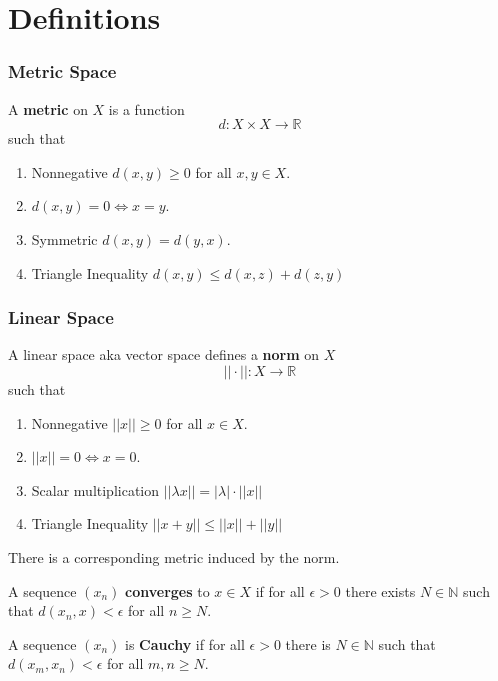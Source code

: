 \documentclass[12pt]{article}
\begin{document}
\section{Definitions}

\subsubsection{Metric Space}
A \textbf{metric} on $X$ is a function
\[
    d: X \times X \rightarrow \mathbb{R}
\]
such that

\begin{enumerate}
    \item Nonnegative $d(x, y) \geq 0$ for all $x, y \in X$.

    \item $d(x, y) = 0 \iff x = y$.

    \item Symmetric $d(x, y) = d(y, x)$.

    \item Triangle Inequality $d(x, y) \leq d(x, z) + d(z, y)$
\end{enumerate}

\subsubsection{Linear Space}
A linear space aka vector space defines a \textbf{norm} on $X$
\[
    || \cdot ||: X \rightarrow \mathbb{R}
\]
such that

\begin{enumerate}
    \item Nonnegative $||x|| \geq 0$ for all $x \in X$.
    \item $||x|| = 0 \iff x = 0$.
    \item Scalar multiplication $|| \lambda x || = |\lambda| \cdot ||x||$
    \item Triangle Inequality $||x + y|| \leq ||x|| + ||y||$

\end{enumerate}

There is a corresponding metric induced by the norm.


A sequence $(x_n)$ \textbf{converges} to $x \in X$ if for all $\epsilon > 0$ there
exists $N \in \mathbb{N}$ such that $d(x_n, x) < \epsilon$ for all $n \geq
N$.

A sequence $(x_n)$ is \textbf{Cauchy} if for all $\epsilon > 0$ there is $N
\in \mathbb{N}$ such that $d(x_m, x_n) < \epsilon$ for all $m, n \geq N$.
\end{document}
